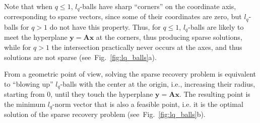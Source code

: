 \documentclass[journal]{IEEEtran}
\begin{document}
%
Note that when $q\leq 1$, $l_q$-balls have sharp “corners” on the coordinate axis, corresponding to sparse vectors, since some of their coordinates are zero, but $l_q$-balls for $q>1$ do not have this property. Thus, for $q \leq 1$, $l_q$-balls are likely to meet the hyperplane $\boldsymbol{y}=\boldsymbol{A} \boldsymbol{x}$ at the corners, thus producing sparse solutions, while for $q>1$ the intersection practically never occurs at the axes, and thus solutions are not sparse (see~Fig.~\ref{fig:lq_balls}a).


From a geometric point of view, solving the sparse recovery problem is equivalent to “blowing up” $l_q$-balls with the center at the origin, i.e., increasing their radius, starting from 0, until they touch the hyperplane $\boldsymbol{y}=\boldsymbol{A} \boldsymbol{x}$. The resulting point is the minimum $l_q$-norm vector that is also a feasible point, i.e. it is the optimal solution of the sparse recovery problem (see~Fig.~\ref{fig:lq_balls}b).
\end{document}
